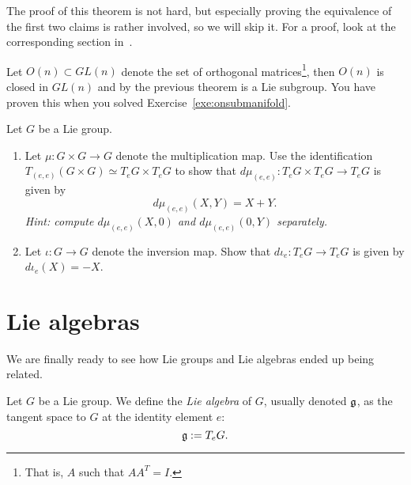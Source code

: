 The proof of this theorem is not hard, but especially proving the equivalence of the first two claims is rather involved, so we will skip it.
For a proof, look at the corresponding section in~\cite[Chapter 20]{book:lee}.

\begin{example}
  Let $O(n)\subset GL(n)$ denote the set of orthogonal matrices\footnote{That is, $A$ such that $AA^T = I$.}, then $O(n)$ is closed in $GL(n)$ and by the previous theorem is a Lie subgroup.
  You have proven this when you solved Exercise~\ref{exe:onsubmanifold}.
\end{example}

\begin{exercise}\label{ex:DiffGroupMaps}
  Let $G$ be a Lie group.
  \begin{enumerate}
    \item Let $\mu:G\times G\to G$ denote the multiplication map.
    Use the identification $T_{(e,e)}(G\times G) \simeq T_eG\times T_eG$ to show that $d\mu_{(e,e)}:T_eG\times T_eG\to T_eG$ is given by
    \begin{equation}
      d\mu_{(e,e)}(X,Y) = X + Y.
    \end{equation}
    \textit{\small Hint: compute $d\mu_{(e,e)}(X,0)$ and $d\mu_{(e,e)}(0,Y)$ separately.}
    \item Let $\iota: G\to G$ denote the inversion map. Show that $d\iota_e:T_eG\to T_eG$ is given by $d\iota_e(X) = -X$.
  \end{enumerate}
\end{exercise}

\section{Lie algebras}

We are finally ready to see how Lie groups and Lie algebras ended up being related.

\begin{definition}
  Let $G$ be a Lie group.
  We define the \emph{Lie algebra} of $G$, usually denoted $\mathfrak{g}$, as the tangent space to $G$ at the identity element $e$:
  \begin{equation}
    \mathfrak{g} := T_e G.
  \end{equation}
\end{definition}

